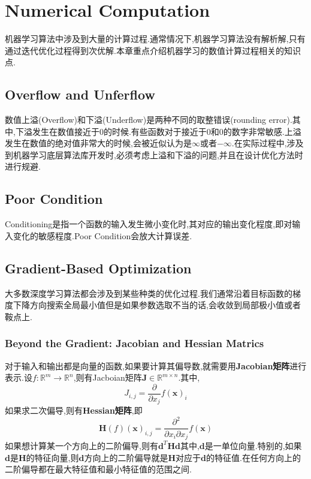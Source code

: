 \chapter{Numerical Computation}

机器学习算法中涉及到大量的计算过程.通常情况下,机器学习算法没有解析解,只有通过迭代优化过程得到次优解.本章重点介绍机器学习的数值计算过程相关的知识点.

\section{Overflow and Unferflow}
数值上溢(Overflow)和下溢(Underflow)是两种不同的取整错误(rounding error).其中,下溢发生在数值接近于$0$的时候.有些函数对于接近于$0$和$0$的数字非常敏感.上溢发生在数值的绝对值非常大的时候,会被近似认为是$\infty$或者$-\infty$.在实际过程中,涉及到机器学习底层算法库开发时,必须考虑上溢和下溢的问题,并且在设计优化方法时进行规避.

\section{Poor Condition}
Conditioning是指一个函数的输入发生微小变化时,其对应的输出变化程度,即对输入变化的敏感程度.Poor Condition会放大计算误差.

\section{Gradient-Based Optimization}
大多数深度学习算法都会涉及到某些种类的优化过程.我们通常沿着目标函数的梯度下降方向搜索全局最小值但是如果参数选取不当的话,会收敛到局部极小值或者鞍点上.

\subsection{Beyond the Gradient: Jacobian and Hessian Matrics}
对于输入和输出都是向量的函数,如果要计算其偏导数,就需要用\textbf{Jacobian矩阵}进行表示.设$f:\mathbb R^m\rightarrow\mathbb R^n$,则有Jacboian矩阵$\bm J\in\mathbb R^{m\times n}$.其中,
\begin{equation}\label{eq:jacobian_matrix}
J_{i,j}=\frac{\partial}{\partial x_j}f(\bm x)_i
\end{equation}
如果求二次偏导,则有\textbf{Hessian矩阵},即
\begin{equation}\label{eq:hessian_matrix}
\bm H(f)(\bm x)_{i,j}=\frac{\partial^2}{\partial x_i\partial x_j}f(\bm x)
\end{equation}
如果想计算某一个方向上的二阶偏导,则有$\bm{d}^T\bm{Hd}$其中,$\bm d$是一单位向量.特别的,如果$\bm d$是$\bm H$的特征向量,则$\bm d$方向上的二阶偏导就是$\bm H$对应于$\bm d$的特征值.在任何方向上的二阶偏导都在最大特征值和最小特征值的范围之间.


